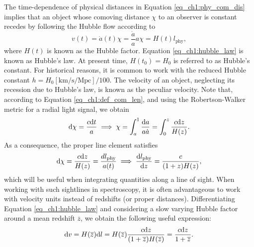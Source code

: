 The time-dependence of physical distances in Equation \ref{eq_ch1:phy_com_dis} implies that an object whose comoving distance $\chi$ to an observer is constant recedes by following the Hubble flow according to
\begin{equation}\label{eq_ch1:hubble_law}
    v(t)=\dot{a}(t)\chi=\frac{\dot{a}}{a}a\chi=H(t)l_\text{phy},
\end{equation}
where $H(t)$ is known as the Hubble factor. Equation \ref{eq_ch1:hubble_law} is known as Hubble's law. At present time, $H(t_0)=H_0$ is referred to as Hubble's constant. For historical reasons, it is common to work with the reduced Hubble constant $h=H_0 [\text{km/s/Mpc}]/100$. The velocity of an object, neglecting its recession due to Hubble's law, is known as the peculiar velocity.
Note that, according to Equation \ref{eq_ch1:def_com_len}, and using the Robertson-Walker metric for a radial light signal, we obtain
\begin{equation}
    \differential \chi=\frac{c\differential t}{a}\implies \chi=\int_a^1\frac{\differential a}{a \dot{a}}=\int_0^z\frac{c \differential z}{H(z)}.
\end{equation}
As a consequence, the proper line element satisfies
\begin{equation}\label{eq_ch1:dl_over_dz}
    \differential \chi =\frac{c\differential z}{H(z)}=\frac{dl_\text{phy}}{a(t)} \implies \frac{\differential l_\text{phy}}{\differential z}=\frac{c}{(1+z)H(z)},
\end{equation}
which will be useful when integrating quantities along a line of sight. When working with such sightlines in spectroscopy, it is often advantageous to work with velocity units instead of redshifts (or proper distances). Differentiating Equation \ref{eq_ch1:hubble_law} and considering a slow varying Hubble factor around a mean redshift $\overline{z}$, we obtain the following useful expression:
\begin{equation}
    \differential v=H(\overline{z})\differential l=H(\overline{z})\frac{c\differential z}{(1+\overline{z})H(\overline{z})}=\frac{c\differential z}{1+\overline{z}}.
\end{equation}

